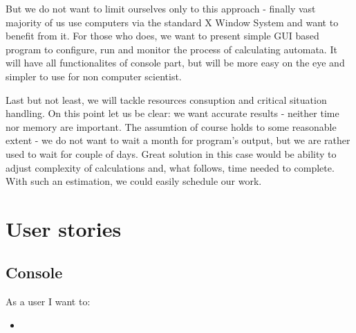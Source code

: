 \documentclass{article}
\begin{document}
But we do not want to limit ourselves only to this approach - finally vast majority of us use computers via the standard X Window System and want to benefit from it. For those who does, we want to present simple GUI based program to configure, run and monitor the process of calculating automata. It will have all functionalites of console part, but will be more easy on the eye and simpler to use for non computer scientist.


Last but not least, we will tackle resources consuption and critical situation handling. On this point let us be clear: we want accurate results - neither time nor memory are important. The assumtion of course holds to some reasonable extent - we do not want to wait a month for program's output, but we are rather used to wait for couple of days. Great solution in this case would be ability to adjust complexity of calculations and, what follows, time needed to complete. With such an estimation, we could easily schedule our work.

\newpage
\section{User stories}

%
%
\subsection{Console}
As a user I want to:
\begin{itemize}
	\item 
\end{itemize}

%
%
\end{document}
